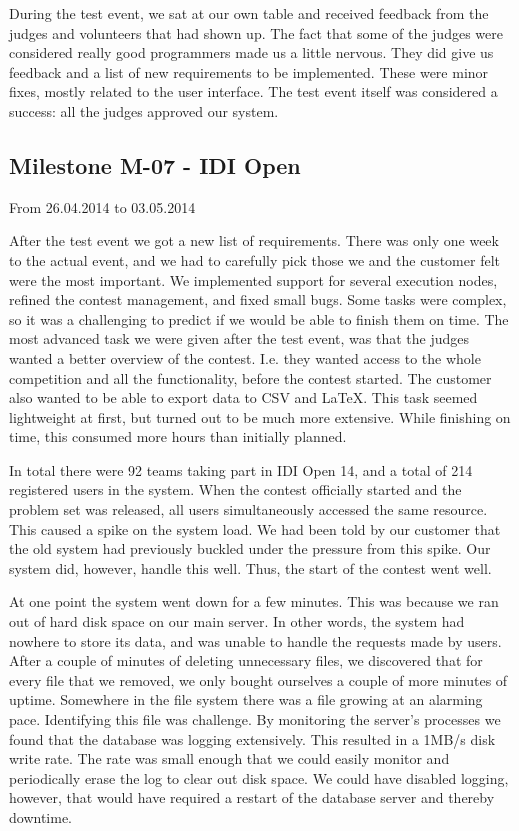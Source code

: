 During the test event, we sat at our own table and received feedback
from the judges and volunteers that had shown up. The fact that some of
the judges were considered really good programmers made us a little
nervous. They did give us feedback and a list of new requirements to be
implemented. These were minor fixes, mostly related to the user
interface. The test event itself was considered a success: all the
judges approved our system.

\subsection{Milestone M-07 - IDI Open}
\label{sec:M07}
From 26.04.2014 to 03.05.2014

After the test event we got a new list of requirements. There was only
one week to the actual event, and we had to carefully pick those we and
the customer felt were the most important. We implemented support for
several execution nodes, refined the contest management, and fixed small
bugs. Some tasks were complex, so it was a challenging to predict if we
would be able to finish them on time. The most advanced task we were
given after the test event, was that the judges wanted a better overview
of the contest. I.e. they wanted access to the whole
competition and all the functionality, before the contest started. The
customer also wanted to be able to export data to CSV and LaTeX. This
task seemed lightweight at first, but turned out to be much more
extensive. While finishing on time, this consumed more hours than
initially planned.

In total there were 92 teams taking part in IDI Open 14, and a total of
214 registered users in the system. When the contest officially started
and the problem set was released, all users simultaneously accessed
the same resource. This caused a spike on the system load. We had been told
by our customer that the old system had previously buckled under the
pressure from this spike. Our system did, however, handle this well. 
Thus, the start of the contest went well. 

At one point the system went down for a few minutes. This was because we
ran out of hard disk space on our main server. In other words, the
system had nowhere to store its data, and was unable to handle the
requests made by users. After a couple of minutes of deleting
unnecessary files, we discovered that for every file that we removed, we
only bought ourselves a couple of more minutes of uptime. Somewhere in
the file system there was a file growing at an alarming pace. 
Identifying this file was challenge. By monitoring the
server's processes we found that the database was logging extensively. 
This resulted in a 1MB/s disk write rate. The rate was small enough that
we could easily monitor and periodically erase the log to clear out
disk space. We could have disabled logging, however, that would have
required a restart of the database server and thereby downtime. 


